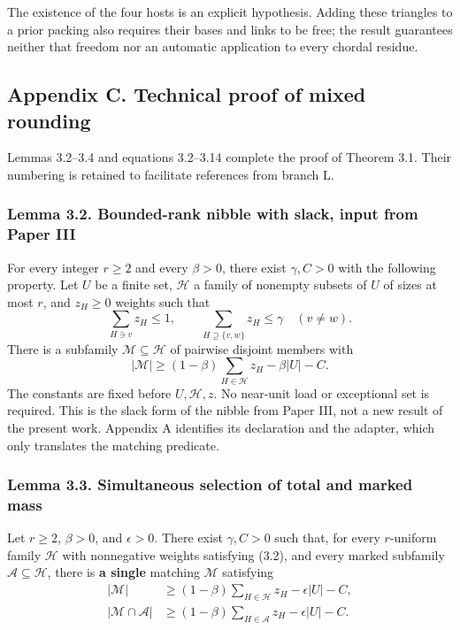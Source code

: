 \documentclass[english,11pt,a4paper]{article}
\newcounter{none}
\begin{document}
The existence of the four hosts is an explicit hypothesis. Adding these triangles to a prior packing also requires their bases and links to be free; the result guarantees neither that freedom nor an automatic application to every chordal residue.

\subsection{Appendix C. Technical proof of mixed rounding}\label{appendix-c.-technical-proof-of-mixed-rounding}

Lemmas 3.2--3.4 and equations 3.2--3.14 complete the proof of Theorem 3.1. Their numbering is retained to facilitate references from branch L.

\subsubsection{Lemma 3.2. Bounded-rank nibble with slack, input from Paper III}\label{lemma-3.2.-bounded-rank-nibble-with-slack-input-from-paper-iii}

For every integer \(r\ge2\) and every \(\beta>0\), there exist \(\gamma,C>0\) with the following property. Let \(U\) be a finite set, \(\mathcal H\) a family of nonempty subsets of \(U\) of sizes at most \(r\), and \(z_H\ge0\) weights such that \[
\sum_{H\ni v}z_H\le1,\qquad
\sum_{H\supseteq\{v,w\}}z_H\le\gamma\quad(v\ne w).
\tag{3.2}
\] There is a subfamily \(\mathcal M\subseteq\mathcal H\) of pairwise disjoint members with \[
|\mathcal M|\ge(1-\beta)\sum_{H\in\mathcal H}z_H-\beta|U|-C.
\tag{3.3}
\] The constants are fixed before \(U,\mathcal H,z\). No near-unit load or exceptional set is required. This is the slack form of the nibble from Paper III, not a new result of the present work. Appendix A identifies its declaration and the adapter, which only translates the matching predicate.

\subsubsection{Lemma 3.3. Simultaneous selection of total and marked mass}\label{lemma-3.3.-simultaneous-selection-of-total-and-marked-mass}

Let \(r\ge2\), \(\beta>0\), and \(\epsilon>0\). There exist \(\gamma,C>0\) such that, for every \(r\)-uniform family \(\mathcal H\) with nonnegative weights satisfying (3.2), and every marked subfamily \(\mathcal A\subseteq\mathcal H\), there is \textbf{a single} matching \(\mathcal M\) satisfying \[
\begin{aligned}
|\mathcal M|&\ge(1-\beta)\sum_{H\in\mathcal H}z_H-\epsilon|U|-C,\\
|\mathcal M\cap\mathcal A|&\ge(1-\beta)\sum_{H\in\mathcal A}z_H-\epsilon|U|-C.
\end{aligned}
\tag{3.4}
\]
\end{document}
